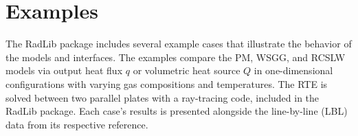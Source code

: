 \documentclass[preprint,12pt]{elsarticle}
\begin{document}

\section{Examples} \label{s:Examples}

The RadLib package includes several example cases that illustrate the behavior of the models and interfaces. The examples compare the PM, WSGG, and RCSLW models via output heat flux $q$ or volumetric heat source $Q$ in one-dimensional configurations with varying gas compositions and temperatures. 
The RTE is solved between two parallel plates with a ray-tracing code, included in the RadLib package. Each case's results is presented alongside the line-by-line (LBL) data from its respective reference. 
\end{document}

